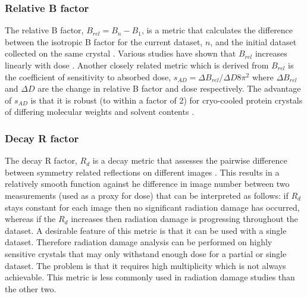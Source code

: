         \subsubsection{Relative B factor}
        \label{subs:Relative B factor}
            The relative B factor, $B_{rel} = B_n - B_1$, is a metric that calculates the difference between the isotropic B factor for the current dataset, $n$, and the initial dataset collected on the same crystal \cite{kmetko2006}.
            Various studies have shown that $B_{rel}$ increases linearly with dose \cite{kmetko2006,borek2007many,bourenkov2010optimization,leal2012}.
            Another closely related metric which is derived from $B_{rel}$ is the coefficient of sensitivity to absorbed dose, $s_{AD} = \Delta B_{rel} / \Delta D 8\pi^2$ where $\Delta B_{rel}$ and $\Delta D$ are the change in relative B factor and dose respectively. The advantage of $s_{AD}$ is that it is robust (to within a factor of 2) for cryo-cooled protein crystals of differing molecular weights and solvent contents \cite{kmetko2006}.

        \subsubsection{Decay R factor}
        \label{subs:Decay R factor}
            The decay R factor, $R_d$ is a decay metric that assesses the pairwise difference between symmetry related reflections on different images \cite{diederichs2006}.
            This results in a relatively smooth function against he difference in image number between two measurements (used as a proxy for dose) that can be interpreted as follows: if $R_d$ stays constant for each image then no significant radiation damage has occurred, whereas if the $R_d$ increases then radiation damage is progressing throughout the dataset.
            A desirable feature of this metric is that it can be used with a single dataset.
            Therefore radiation damage analysis can be performed on highly sensitive crystals that may only withstand enough dose for a partial or single dataset.
			The problem is that it requires high multiplicity which is not always achievable. This metric is less commonly used in radiation damage studies than the other two.

